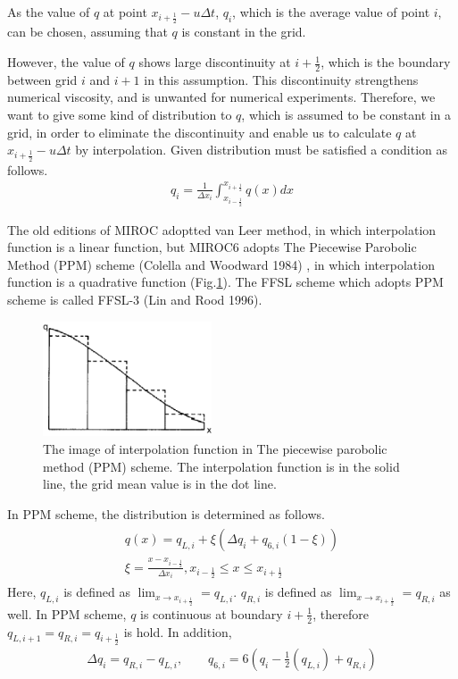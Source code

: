As the value of \(q\) at point \(x_{i+\frac{1}{2}}-u\Delta t\), \(q_{i}\), which is the average value of point \(i\), can be chosen, assuming that \(q\) is constant in the grid.

However, the value of \(q\) shows large discontinuity at \(i+\frac{1}{2}\), which is the boundary between grid \(i\) and \(i+1\) in this assumption. This discontinuity strengthens numerical viscosity,
and is unwanted for numerical experiments. Therefore, we want to give some kind of distribution to \(q\), which is assumed to be constant in a grid, in order to eliminate the discontinuity and enable
us to calculate \(q\) at \(x_{i+\frac{1}{2}}-u\Delta t\) by interpolation. Given distribution must be satisfied a condition as follows.
\begin{eqnarray}q_{i}=\frac{1}{\Delta x_{i}} \int_{x_{i-\frac{1}{2}}}^{x_{i+\frac{1}{2}}} q(x) dx\end{eqnarray}

The old editions of MIROC adoptted van Leer method, in which interpolation function is a linear function, but MIROC6 adopts The Piecewise Parobolic Method (PPM) scheme (Colella and Woodward 1984) , in
which interpolation function is a quadrative function (Fig.\ref{f1}). The FFSL scheme which adopts PPM scheme is called FFSL-3 (Lin and Rood 1996).

\begin{figure}
\hypertarget{f1}{%
\centering
\includegraphics[width=5cm,height=\textheight]{../figures/ppm_interpolate.png}
\caption{The image of interpolation function in The piecewise parobolic method (PPM) scheme. The interpolation function is in the solid line, the grid mean value is in the dot line.}\label{f1}
}
\end{figure}

In PPM scheme, the distribution is determined as follows. \begin{eqnarray}\begin{split}
\label{a4}
  q(x)=q_{L,i}+\xi (\Delta q_{i}+q_{6,i}(1-\xi))\\
  \xi=\frac{x-x_{i-\frac{1}{2}}}{\Delta x_{i}},  x_{i-\frac{1}{2}}\leq x \leq x_{i+\frac{1}{2}}
  \end{split}\end{eqnarray} Here, \(q_{L,i}\) is defined as \(\lim_{x \to x_{i+\frac{1}{2}}}=q_{L,i}\). \(q_{R,i}\) is defined as \(\lim_{x \to x_{i+\frac{1}{2}}}=q_{R,i}\) as well. In PPM scheme, \(q\) is
continuous at boundary \(i+\frac{1}{2}\), therefore \(q_{L,i+1}=q_{R,i}=q_{i+\frac{1}{2}}\) is hold. In addition, \begin{eqnarray}\Delta q_{i}=q_{R,i}-q_{L,i},\qquad q_{6,i}=6(q_{i}-\frac{1}{2}(q_{L,i})+q_{R,i})\end{eqnarray}

